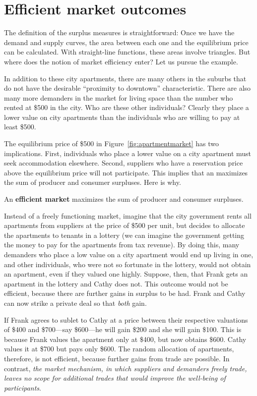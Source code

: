 \section{Efficient market outcomes}\label{sec:ch5sec3}

The definition of the surplus measures is straightforward: Once we have the demand and supply curves, the area between each one and the equilibrium price can be calculated. With straight-line functions, these areas involve triangles. But where does the notion of market efficiency enter? Let us pursue the example.

In addition to these city apartments, there are many others in the suburbs that do not have the desirable ``proximity to downtown'' characteristic. There are also many more demanders in the market for living space than the number who rented at \$500 in the city. Who are these other individuals? Clearly they place a lower value on city apartments than the individuals who are willing to pay at least \$500.

The equilibrium price of \$500 in Figure~\ref{fig:apartmentmarket} has two implications. First, individuals who place a lower value on a city apartment must seek accommodation elsewhere. Second, suppliers who have a reservation price above the equilibrium price will not participate. This implies that an  maximizes the sum of producer and consumer surpluses. Here is why.

\begin{DefBox}
An \textbf{efficient market} maximizes the sum of producer and consumer surpluses.
\end{DefBox}

Instead of a freely functioning market, imagine that the city government rents all apartments from suppliers at the price of \$500 per unit, but decides to allocate the apartments to tenants in a lottery (we can imagine the government getting the money to pay for the apartments from tax revenue). By doing this, many demanders who place a low value on a city apartment would end up living in one, and other individuals, who were not so fortunate in the lottery, would not obtain an apartment, even if they valued one highly. Suppose, then, that Frank gets an apartment in the lottery and Cathy does not. This outcome would not be efficient, because there are further gains in surplus to be had. Frank and Cathy can now strike a private deal so that \textit{both} gain.

If Frank agrees to sublet to Cathy at a price between their respective valuations of \$400 and \$700---say \$600---he will gain \$200 and she will gain \$100. This is because Frank values the apartment only at \$400, but now obtains \$600. Cathy values it at \$700 but pays only \$600. The random allocation of apartments, therefore, is not efficient, because further gains from trade are possible. In contrast, \textit{the market mechanism, in which suppliers and demanders freely trade, leaves no scope for additional trades that would improve the well-being of participants}.

